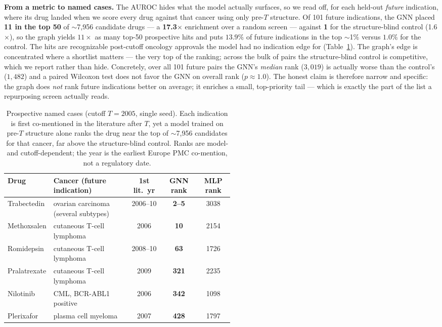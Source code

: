 \documentclass[11pt]{article}
\begin{document}
\textbf{From a metric to named cases.} The AUROC hides what the model actually surfaces, so
we read off, for each held-out \emph{future} indication, where its drug landed when we score
every drug against that cancer using only pre-$T$ structure. Of 101 future indications, the
GNN placed \textbf{11 in the top 50} of $\sim$7{,}956 candidate drugs --- a
\textbf{17.3$\times$} enrichment over a random screen --- against \textbf{1} for the
structure-blind control (1.6$\times$), so the graph yields $11\times$ as many top-50
prospective hits and puts $13.9\%$ of future indications in the top $\sim$1\% versus $1.0\%$
for the control. The hits are recognizable post-cutoff oncology approvals the model had no
indication edge for (Table~\ref{tab:cases}). The graph's edge is concentrated where a
shortlist matters --- the very top of the ranking; across the bulk of pairs the
structure-blind control is competitive, which we report rather than hide. Concretely, over
all 101 future pairs the GNN's \emph{median} rank ($3{,}019$) is actually worse than the
control's ($1{,}482$) and a paired Wilcoxon test does not favor the GNN on overall rank
($p\approx1.0$). The honest claim is therefore narrow and specific: the graph does
\emph{not} rank future indications better on average; it enriches a small, top-priority tail
--- which is exactly the part of the list a repurposing screen actually reads.

\begin{table}[H]
\centering\small
\begin{tabular}{>{\raggedright\arraybackslash}p{0.18\linewidth} >{\raggedright\arraybackslash}p{0.34\linewidth} c c c}
\toprule
\rowcolor{sriblue}\color{white}\textbf{Drug} & \color{white}\textbf{Cancer (future indication)} & \color{white}\textbf{1st lit.\ yr} & \color{white}\textbf{GNN rank} & \color{white}\textbf{MLP rank}\\
\midrule
\rowcolor{srirow} Trabectedin & ovarian carcinoma (several subtypes) & 2006--10 & \textbf{2--5} & 3038\\
Methoxsalen & cutaneous T-cell lymphoma & 2006 & \textbf{10} & 2154\\
Romidepsin & cutaneous T-cell lymphoma & 2008--10 & \textbf{63} & 1726\\
\rowcolor{srirow} Pralatrexate & cutaneous T-cell lymphoma & 2009 & \textbf{321} & 2235\\
Nilotinib & CML, BCR-ABL1 positive & 2006 & \textbf{342} & 1098\\
\rowcolor{srirow} Plerixafor & plasma cell myeloma & 2007 & \textbf{428} & 1797\\
\bottomrule
\end{tabular}
\caption{Prospective named cases (cutoff $T=2005$, single seed). Each indication is first
co-mentioned in the literature after $T$, yet a model trained on pre-$T$ structure alone
ranks the drug near the top of $\sim$7{,}956 candidates for that cancer, far above the
structure-blind control. Ranks are model- and cutoff-dependent; the year is the earliest
Europe PMC co-mention, not a regulatory date.}
\label{tab:cases}
\end{table}
\end{document}
